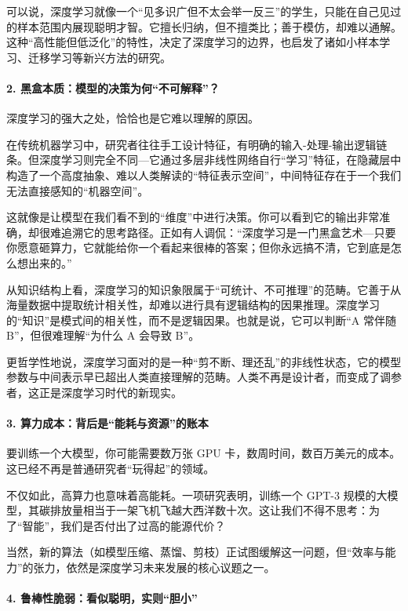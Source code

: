 可以说，深度学习就像一个“见多识广但不太会举一反三”的学生，只能在自己见过的样本范围内展现聪明才智。它擅长归纳，但不擅类比；善于模仿，却难以通解。这种“高性能但低泛化”的特性，决定了深度学习的边界，也启发了诸如小样本学习、迁移学习等新兴方法的研究。

\paragraph*{2. 黑盒本质：模型的决策为何“不可解释”？}

深度学习的强大之处，恰恰也是它难以理解的原因。

在传统机器学习中，研究者往往手工设计特征，有明确的输入-处理-输出逻辑链条。但深度学习则完全不同---它通过多层非线性网络自行“学习”特征，在隐藏层中构造了一个高度抽象、难以人类解读的“特征表示空间”，中间特征存在于一个我们无法直接感知的“机器空间”。

这就像是让模型在我们看不到的“维度”中进行决策。你可以看到它的输出非常准确，却很难追溯它的思考路径。正如有人调侃：“深度学习是一门黑盒艺术---只要你愿意砸算力，它就能给你一个看起来很棒的答案；但你永远搞不清，它到底是怎么想出来的。”

从知识结构上看，深度学习的知识象限属于“可统计、不可推理”的范畴。它善于从海量数据中提取统计相关性，却难以进行具有逻辑结构的因果推理。深度学习的“知识”是模式间的相关性，而不是逻辑因果。也就是说，它可以判断“A 常伴随 B”，但很难理解“为什么 A 会导致 B”。

更哲学性地说，深度学习面对的是一种“剪不断、理还乱”的非线性状态，它的模型参数与中间表示早已超出人类直接理解的范畴。人类不再是设计者，而变成了调参者，这正是深度学习时代的新现实。

\paragraph*{3. 算力成本：背后是“能耗与资源”的账本}

要训练一个大模型，你可能需要数万张 GPU 卡，数周时间，数百万美元的成本。这已经不再是普通研究者“玩得起”的领域。

不仅如此，高算力也意味着高能耗。一项研究表明，训练一个 GPT-3 规模的大模型，其碳排放量相当于一架飞机飞越大西洋数十次。这让我们不得不思考：为了“智能”，我们是否付出了过高的能源代价？

当然，新的算法（如模型压缩、蒸馏、剪枝）正试图缓解这一问题，但“效率与能力”的张力，依然是深度学习未来发展的核心议题之一。

\paragraph*{4. 鲁棒性脆弱：看似聪明，实则“胆小”}

